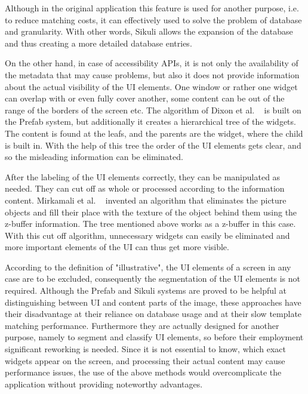 \documentclass[draft,final]{vutinfth} %
\begin{document}
	Although in the original application this feature is used for another purpose, i.e. to reduce matching costs, it can effectively used to solve the problem of database and granularity.
	With other words, Sikuli allows the expansion of the database and thus creating a more detailed database entries.\par	
	On the other hand, in case of accessibility APIs, it is not only the availability of the metadata that may cause problems, but also it does not provide information about the actual visibility of the UI elements.
	One window or rather one widget can overlap with or even fully cover another, some content can be out of the range of the borders of the screen etc.    
	The algorithm of Dixon et al. ~\cite{dixon2011content} is built on the Prefab system, but additionally it creates a hierarchical tree of the widgets. 
	The content is found at the leafs, and the parents are the widget, where the child is built in.
	With the help of this tree the order of the UI elements gets clear, and so the misleading information can be eliminated.\par
	After the labeling of the UI elements correctly, they can be manipulated as needed.
	They can cut off as whole or processed according to the information content.
	Mirkamali et al. ~\cite{mirkamali2015object} invented an algorithm that eliminates the picture objects and fill their place with the texture of the object behind them using the z-buffer information.
	The tree mentioned above works as a z-buffer in this case.
	With this cut off algorithm, unnecessary widgets can easily be eliminated and more important elements of the UI can thus get more visible.\par
	According to the definition of "illustrative", the UI elements of a screen in any case are to be excluded, consequently the segmentation of the UI elements is not required.
	Although the Prefab and Sikuli systems are proved to be helpful at distinguishing between UI and content parts of the image, these approaches have their disadvantage at their reliance on database usage and at their slow template matching performance. 
	Furthermore they are actually designed for another purpose, namely to segment and classify UI elements, so before their employment significant reworking is needed.
	Since it is not essential to know, which exact widgets appear on the screen, and processing their actual content may cause performance issues, the use of the above methods would overcomplicate the application without providing noteworthy advantages.
	
\end{document}
